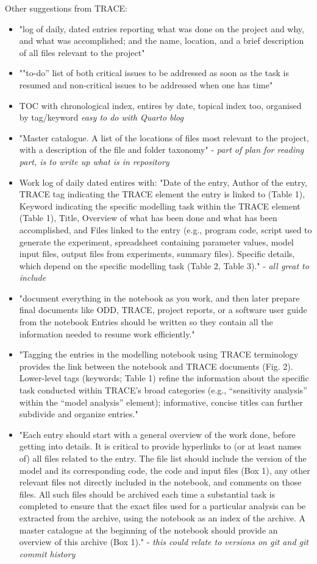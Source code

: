 Other suggestions from TRACE:
\begin{itemize}
    \item "log of daily, dated entries reporting what was done on the project and why, and what was accomplished; and the name, location, and a brief description of all files relevant to the project"
    \item ""to-do” list of both critical issues to be addressed as soon as the task is resumed and non-critical issues to be addressed when one has time"
    \item TOC with chronological index, entires by date, topical index too, organised by tag/keyword \textit{easy to do with Quarto blog}
    \item "Master catalogue. A list of the locations of files most relevant to the project, with a description of the file and folder taxonomy" - \textit{part of plan for reading part, is to write up what is in repository}
    \item Work log of daily dated entires with: "Date of the entry, Author of the entry, TRACE tag indicating the TRACE element the entry is linked to (Table 1), Keyword indicating the specific modelling task within the TRACE element (Table 1), Title, Overview of what has been done and what has been accomplished, and Files linked to the entry (e.g., program code, script used to generate the experiment, spreadsheet containing parameter values, model input files, output files from experiments, summary files). Specific details, which depend on the specific modelling task (Table 2, Table 3)." - \textit{all great to include}
    \item "document everything in the notebook as you work, and then later prepare final documents like ODD, TRACE, project reports, or a software user guide from the notebook Entries should be written so they contain all the information needed to resume work efficiently."
    \item "Tagging the entries in the modelling notebook using TRACE terminology provides the link between the notebook and TRACE documents (Fig. 2). Lower-level tags (keywords; Table 1) refine the information about the specific task conducted within TRACE's broad categories (e.g., “sensitivity analysis” within the “model analysis” element); informative, concise titles can further subdivide and organize entries."
    \item "Each entry should start with a general overview of the work done, before getting into details. It is critical to provide hyperlinks to (or at least names of) all files related to the entry. The file list should include the version of the model and its corresponding code, the code and input files (Box 1), any other relevant files not directly included in the notebook, and comments on those files. All such files should be archived each time a substantial task is completed to ensure that the exact files used for a particular analysis can be extracted from the archive, using the notebook as an index of the archive. A master catalogue at the beginning of the notebook should provide an overview of this archive (Box 1)." - \textit{this could relate to versions on git and git commit history}

\end{itemize}
